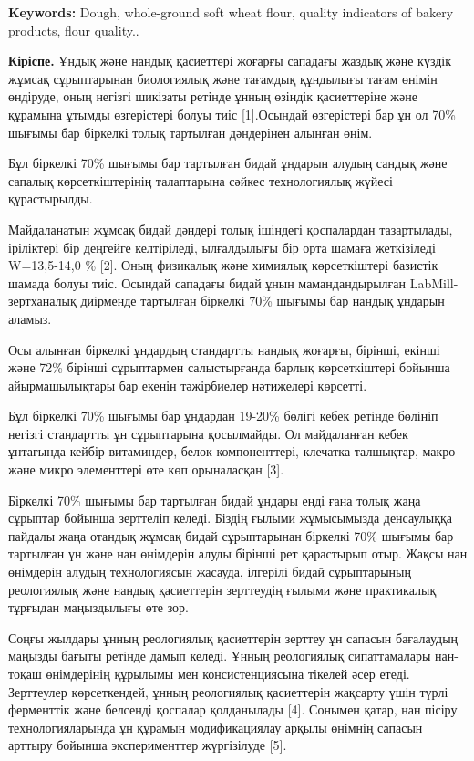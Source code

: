 {{{\bfseries Keywords:} Dough, whole-ground soft wheat flour, quality
indicators of bakery products, flour quality..

{\bfseries Кіріспе.} Ұндық және нандық қасиеттері жоғарғы сападағы жаздық
және күздік жұмсақ сұрыптарынан биологиялық және тағамдық құндылығы
тағам өнімін өндіруде, оның негізгі шикізаты ретінде ұнның өзіндік
қасиеттеріне және құрамына ұтымды өзгерістері болуы тиіс {[}1{]}.Осындай
өзгерістері бар ұн ол 70\% шығымы бар біркелкі толық тартылған
дәндерінен алынған өнім.

Бұл біркелкі 70\% шығымы бар тартылған бидай ұндарын алудың сандық және
сапалық көрсеткіштерінің талаптарына сәйкес технологиялық жүйесі
құрастырылды.

Майдаланатын жұмсақ бидай дәндері толық ішіндегі қоспалардан
тазартылады, іріліктері бір деңгейге келтіріледі, ылғалдылығы бір орта
шамаға жеткізіледі W=13,5-14,0 \% {[}2{]}. Оның физикалық және химиялық
көрсеткіштері базистік шамада болуы тиіс. Осындай сападағы бидай ұнын
мамандандырылған LabMill- зертханалық диірменде тартылған біркелкі 70\%
шығымы бар нандық ұндарын аламыз.

Осы алынған біркелкі ұндардың стандартты нандық жоғарғы, бірінші, екінші
және 72\% бірінші сұрыптармен салыстырғанда барлық көрсеткіштері бойынша
айырмашылықтары бар екенін тәжірбиелер нәтижелері көрсетті.

Бұл біркелкі 70\% шығымы бар ұндардан 19-20\% бөлігі кебек ретінде
бөлініп негізгі стандартты ұн сұрыптарына қосылмайды. Ол майдаланған
кебек ұнтағында кейбір витаминдер, белок компоненттері, клечатка
талшықтар, макро және микро элементтері өте көп орыналасқан {[}3{]}.

Біркелкі 70\% шығымы бар тартылған бидай ұндары енді ғана толық жаңа
сұрыптар бойынша зерттеліп келеді. Біздің ғылыми жұмысымызда денсаулыққа
пайдалы жаңа отандық жұмсақ бидай сұрыптарынан біркелкі 70\% шығымы бар
тартылған ұн және нан өнімдерін алуды бірінші рет қарастырып отыр. Жақсы
нан өнімдерін алудың технологиясын жасауда, ілгерілі бидай сұрыптарының
реологиялық және нандық қасиеттерін зерттеудің ғылыми және практикалық
тұрғыдан маңыздылығы өте зор.

Соңғы жылдары ұнның реологиялық қасиеттерін зерттеу ұн сапасын
бағалаудың маңызды бағыты ретінде дамып келеді. Ұнның реологиялық
сипаттамалары нан-тоқаш өнімдерінің құрылымы мен консистенциясына
тікелей әсер етеді. Зерттеулер көрсеткендей, ұнның реологиялық
қасиеттерін жақсарту үшін түрлі ферменттік және белсенді қоспалар
қолданылады {[}4{]}. Сонымен қатар, нан пісіру технологияларында ұн
құрамын модификациялау арқылы өнімнің сапасын арттыру бойынша
эксперименттер жүргізілуде {[}5{]}.

}}

